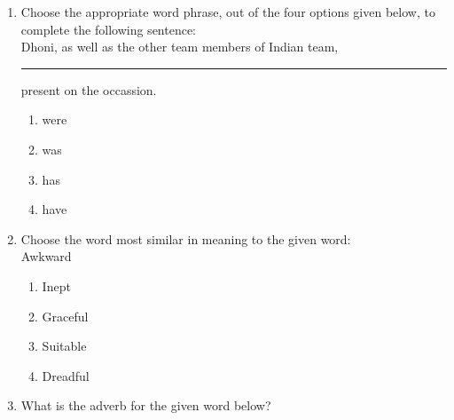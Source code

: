 \documentclass[journal]{IEEEtran}
\begin{document}
\begin{enumerate}
    

 
    \item  Choose the appropriate word phrase, out of the four options given below, to complete the following sentence:\\
    Dhoni, as well as the other team members of Indian team,\rule{1cm}{0.15mm} present on the occassion.
    \hfill{}
    \begin{multicols}{4}
        
    
\begin{enumerate}
    \item were 
    \item was
    \item has
    \item have
\end{enumerate}
   \end{multicols}
        
  \item   Choose the word most similar in meaning to the given word:\\Awkward
   \hfill{}
  \begin{multicols}{4}
    \begin{enumerate}
        \item Inept 
        \item Graceful
        \item Suitable
        \item Dreadful
    \end{enumerate}  
  \end{multicols}

 
  
  \item What is the adverb for the given word below?


\end{enumerate}
\end{document}
